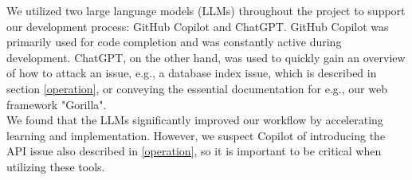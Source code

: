 We utilized two large language models (LLMs) throughout the project to support our development process: GitHub Copilot and ChatGPT. GitHub Copilot was primarily used for code completion and was constantly active during development. ChatGPT, on the other hand, was used to quickly gain an overview of how to attack an issue, e.g., a database index issue, which is described in section \ref{operation}, or conveying the essential documentation for e.g., our web framework "Gorilla".
\\
We found that the LLMs significantly improved our workflow by accelerating learning and implementation. However, we suspect Copilot of introducing the API issue also described in \ref{operation}, so it is important to be critical when utilizing these tools.